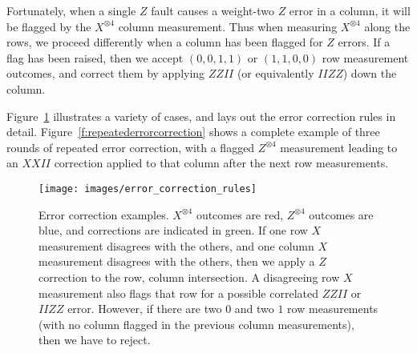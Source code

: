 \documentclass[10pt, twocolumn, aps, nofootinbib, longbibliography, nobibnotes, superscriptaddress]{revtex4-1} %
\begin{document}
Fortunately, when a single $Z$ fault causes a weight-two $Z$ error in a column, it will be flagged by the $X^{\otimes 4}$ column measurement.  Thus when measuring $X^{\otimes 4}$ along the rows, we proceed differently when a column has been flagged for $Z$ errors.  If a flag has been raised, then we accept $(0,0,1,1)$ or $(1,1,0,0)$ row measurement outcomes, and correct them by applying $ZZII$ (or equivalently $IIZZ$) down the column.  

Figure~\ref{f:errorcorrectionexamples} illustrates a variety of cases, and  lays out the error correction rules in detail.  
Figure~\ref{f:repeatederrorcorrection} shows a complete example of three rounds of repeated error correction, with a flagged $Z^{\otimes 4}$ measurement leading to an $XXII$ correction applied to that column after the next row measurements.  %

\begin{figure}
{\texttt{[image: images/error\_correction\_rules]}}
\caption{Error correction examples.  
$X^{\otimes 4}$ outcomes are red, $Z^{\otimes 4}$ outcomes are blue, and corrections are indicated in green.  
If one row $X$ measurement disagrees with the others, and one column $X$ measurement disagrees with the others, then we apply a $Z$ correction to the row, column intersection.  A disagreeing row $X$ measurement also flags that row for a possible correlated $ZZII$ or $IIZZ$ error.  However, if there are two $0$ and two $1$ row measurements (with no column flagged in the previous column measurements), then we have to reject.}
\label{f:errorcorrectionexamples}
\end{figure}
\end{document}
